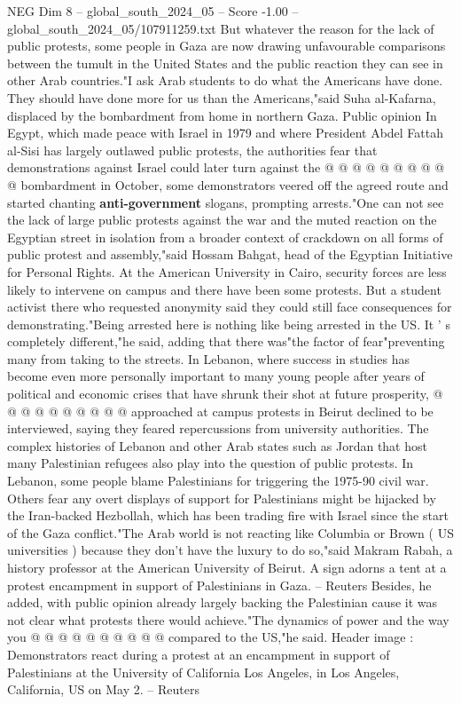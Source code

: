 \begin{textsample}{NEG Dim 8 – global\_south\_2024\_05 – Score -1.00 – global\_south\_2024\_05/107911259.txt}
But whatever the reason for the lack of public protests, some people in Gaza are now drawing unfavourable comparisons between the tumult in the United States and the public reaction they can see in other Arab countries."I ask Arab students to do what the Americans have done.
They should have done more for us than the Americans,"said Suha al-Kafarna, displaced by the bombardment from home in northern Gaza.
Public opinion In Egypt, which made peace with Israel in 1979 and where President Abdel Fattah al-Sisi has largely outlawed public protests, the authorities fear that demonstrations against Israel could later turn against the @ @ @ @ @ @ @ @ @ @ bombardment in October, some demonstrators veered off the agreed route and started chanting \textbf{anti-government} slogans, prompting arrests."One can not see the lack of large public protests against the war and the muted reaction on the Egyptian street in isolation from a broader context of crackdown on all forms of public protest and assembly,"said Hossam Bahgat, head of the Egyptian Initiative for Personal Rights.
At the American University in Cairo, security forces are less likely to intervene on campus and there have been some protests.
But a student activist there who requested anonymity said they could still face consequences for demonstrating."Being arrested here is nothing like being arrested in the US.
It ' s completely different,"he said, adding that there was"the factor of fear"preventing many from taking to the streets.
In Lebanon, where success in studies has become even more personally important to many young people after years of political and economic crises that have shrunk their shot at future prosperity, @ @ @ @ @ @ @ @ @ @ approached at campus protests in Beirut declined to be interviewed, saying they feared repercussions from university authorities.
The complex histories of Lebanon and other Arab states such as Jordan that host many Palestinian refugees also play into the question of public protests.
In Lebanon, some people blame Palestinians for triggering the 1975-90 civil war.
Others fear any overt displays of support for Palestinians might be hijacked by the Iran-backed Hezbollah, which has been trading fire with Israel since the start of the Gaza conflict."The Arab world is not reacting like Columbia or Brown ( US universities ) because they don't have the luxury to do so,"said Makram Rabah, a history professor at the American University of Beirut.
A sign adorns a tent at a protest encampment in support of Palestinians in Gaza. -- Reuters Besides, he added, with public opinion already largely backing the Palestinian cause it was not clear what protests there would achieve."The dynamics of power and the way you @ @ @ @ @ @ @ @ @ @ compared to the US,"he said.
Header image : Demonstrators react during a protest at an encampment in support of Palestinians at the University of California Los Angeles, in Los Angeles, California, US on May 2. -- Reuters

\end{textsample}
